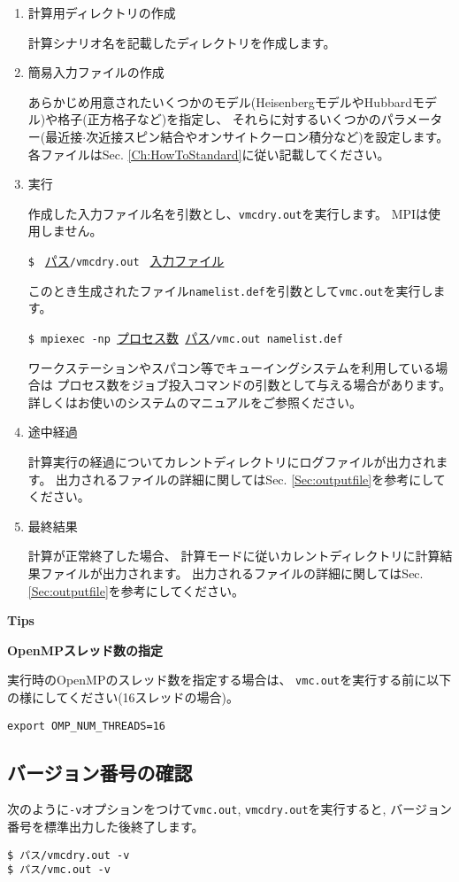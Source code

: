  \begin{enumerate}
   \item  計算用ディレクトリの作成

計算シナリオ名を記載したディレクトリを作成します。

   \item  {簡易入力ファイルの作成}

あらかじめ用意されたいくつかのモデル(HeisenbergモデルやHubbardモデル)や格子(正方格子など)を指定し、
それらに対するいくつかのパラメーター(最近接$\cdot$次近接スピン結合やオンサイトクーロン積分など)を設定します。
各ファイルはSec. \ref{Ch:HowToStandard}に従い記載してください。

 \item  実行

作成した入力ファイル名を引数とし、\verb|vmcdry.out|を実行します。
MPIは使用しません。

\verb|$ | \underline{パス}\verb|/vmcdry.out | \underline{入力ファイル} 

このとき生成されたファイル\verb|namelist.def|を引数として\verb|vmc.out|を実行します。

\verb|$ mpiexec -np |\underline{プロセス数}\verb| |\underline{パス}\verb|/vmc.out namelist.def|

ワークステーションやスパコン等でキューイングシステムを利用している場合は
プロセス数をジョブ投入コマンドの引数として与える場合があります。
詳しくはお使いのシステムのマニュアルをご参照ください。

\item 途中経過

計算実行の経過についてカレントディレクトリにログファイルが出力されます。
出力されるファイルの詳細に関してはSec. \ref{Sec:outputfile}を参考にしてください。

\item 最終結果

計算が正常終了した場合、
計算モードに従いカレントディレクトリに計算結果ファイルが出力されます。
出力されるファイルの詳細に関してはSec. \ref{Sec:outputfile}を参考にしてください。
\end{enumerate}

\begin{screen}
\Large 
{\bf Tips}
\normalsize

{\bf OpenMPスレッド数の指定}

実行時のOpenMPのスレッド数を指定する場合は、
\verb|vmc.out|を実行する前に以下の様にしてください(16スレッドの場合)。
\begin{verbatim}
export OMP_NUM_THREADS=16
\end{verbatim}

\end{screen}

\subsection{バージョン番号の確認}

次のように\verb|-v|オプションをつけて\verb|vmc.out|, \verb|vmcdry.out|を実行すると, 
バージョン番号を標準出力した後終了します。

\begin{verbatim}
$ パス/vmcdry.out -v
$ パス/vmc.out -v
\end{verbatim}


